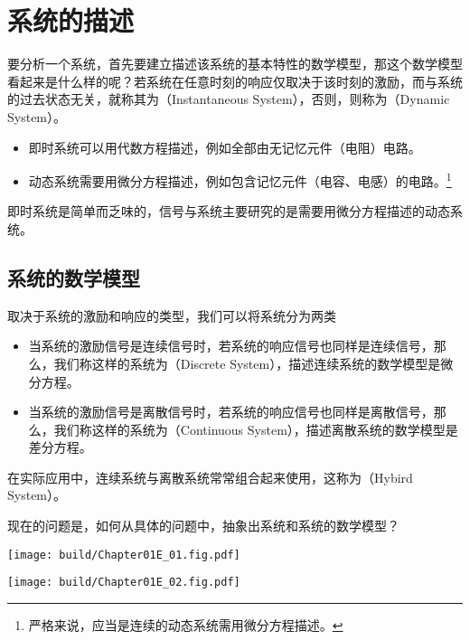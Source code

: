 \section{系统的描述}

要分析一个系统，首先要建立描述该系统的基本特性的数学模型，那这个数学模型看起来是什么样的呢？若系统在任意时刻的响应仅取决于该时刻的激励，而与系统的过去状态无关，就称其为（Instantaneous System），否则，则称为（Dynamic System）。
\begin{itemize}
    \item 即时系统可以用代数方程描述，例如全部由无记忆元件（电阻）电路。
    \item 动态系统需要用微分方程描述，例如包含记忆元件（电容、电感）的电路。\footnote{严格来说，应当是连续的动态系统需用微分方程描述。}
\end{itemize}
即时系统是简单而乏味的，信号与系统主要研究的是需要用微分方程描述的动态系统。

\subsection{系统的数学模型}
取决于系统的激励和响应的类型，我们可以将系统分为两类
\begin{itemize}
    \item 当系统的激励信号是连续信号时，若系统的响应信号也同样是连续信号，那么，我们称这样的系统为（Discrete System），描述连续系统的数学模型是微分方程。
    \item 当系统的激励信号是离散信号时，若系统的响应信号也同样是离散信号，那么，我们称这样的系统为（Continuous System），描述离散系统的数学模型是差分方程。
\end{itemize}

在实际应用中，连续系统与离散系统常常组合起来使用，这称为（Hybird System）。\goodbreak

现在的问题是，如何从具体的问题中，抽象出系统和系统的数学模型？
\begin{Figure}[两个典型的系统]
    \begin{FigureSub}[电路系统]
        \texttt{[image: build/Chapter01E\_01.fig.pdf]}
    \end{FigureSub}
    \hspace{0.5cm}
    \begin{FigureSub}[力学系统]
        \texttt{[image: build/Chapter01E\_02.fig.pdf]}
    \end{FigureSub}
\end{Figure}

